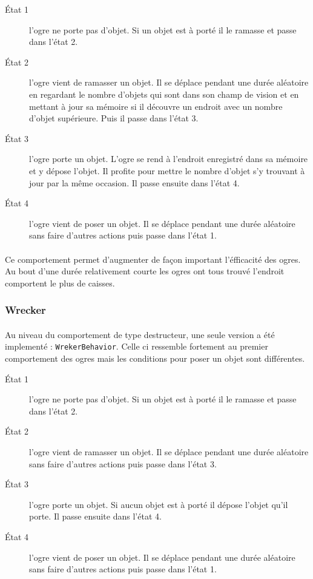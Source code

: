 \begin{description}
    \item[\'Etat 1] l'ogre ne porte pas d'objet. Si un objet est à porté il
        le ramasse et passe dans l'état 2.
    \item[\'Etat 2] l'ogre vient de ramasser un objet. Il se déplace pendant une
        durée aléatoire en regardant le nombre d'objets qui sont dans son
        champ de vision et en mettant à jour sa mémoire si il découvre un
        endroit avec un nombre d'objet supérieure. Puis il passe dans l'état 3.
    \item[\'Etat 3] l'ogre porte un objet. L'ogre se rend à l'endroit
        enregistré dans sa mémoire et y dépose l'objet. Il profite pour mettre
        le nombre d'objet s'y trouvant à jour par la même occasion. Il passe
        ensuite dans l'état 4.
    \item[\'Etat 4] l'ogre vient de poser un objet. Il se déplace pendant une
        durée aléatoire sans faire d'autres actions puis passe dans l'état 1.
\end{description}

\paragraph{}Ce comportement permet d'augmenter de façon important l'éfficacité
des ogres. Au bout d'une durée relativement courte les ogres ont tous trouvé
l'endroit comportent le plus de caisses. 

\subsubsection{Wrecker}
\paragraph{}Au niveau du comportement de type destructeur, une seule version a
été implementé : \texttt{WrekerBehavior}. Celle ci ressemble fortement au premier comportement des
ogres mais les conditions pour poser un objet sont différentes. 

\begin{description}
    \item[\'Etat 1] l'ogre ne porte pas d'objet. Si un objet est à porté il
        le ramasse et passe dans l'état 2.
    \item[\'Etat 2] l'ogre vient de ramasser un objet. Il se déplace pendant une
        durée aléatoire sans faire d'autres actions puis passe dans l'état 3.
    \item[\'Etat 3] l'ogre porte un objet. Si aucun objet est à porté il
        dépose l'objet qu'il porte. Il passe ensuite dans
        l'état 4.
    \item[\'Etat 4] l'ogre vient de poser un objet. Il se déplace pendant une
        durée aléatoire sans faire d'autres actions puis passe dans l'état 1.
\end{description}


